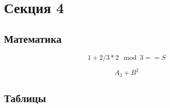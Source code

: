 \section{Секция 4}

\subsection{Математика}

\[
    1 + 2 / 3 * 2 \mod 3 == S 
\]


\begin{equation}
    A_{3} + B^2 
\end{equation}

\subsection{Таблицы}

